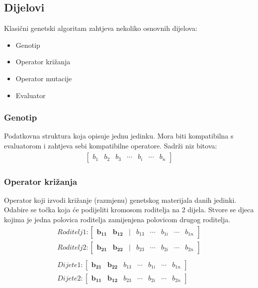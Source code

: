 \documentclass[times, utf8, zavrsni]{fer}
\begin{document}
\subsection{Dijelovi}
Klasični genetski algoritam zahtjeva nekoliko osnovnih dijelova:
\begin{itemize}
\item Genotip 
\item Operator križanja 
\item Operator mutacije
\item Evaluator 
\end{itemize}

\subsubsection{Genotip}
Podatkovna struktura koja opisuje jednu jedinku. Mora biti kompatibilna s evaluatorom i zahtjeva sebi kompatibilne operatore. Sadrži niz bitova:
\begin{align*}
\begin{bmatrix}
b_1 & b_2 & b_3 & \cdots & b_i & \cdots & b_n
\end{bmatrix}
\end{align*}
\subsubsection{Operator križanja}
Operator koji izvodi križanje (razmjenu) genetskog materijala danih jedinki. Odabire se točka koja će podijeliti kromosom roditelja na 2 dijela. Stvore se djeca kojima je jedna polovica roditelja zamijenjena polovicom drugog roditelja.
\begin{align*}
Roditelj 1:
\begin{bmatrix}
\mathbf{b_{11}} & \mathbf{b_{12}} & | & b_{13} & \cdots & b_{1i} & \cdots & b_{1n}
\end{bmatrix} \\
Roditelj 2:
\begin{bmatrix}
\mathbf{b_{21}} & \mathbf{b_{22}} & | & b_{23} & \cdots & b_{2i} & \cdots & b_{2n}
\end{bmatrix} \\\\
Dijete 1:
\begin{bmatrix}
\mathbf{b_{21}} & \mathbf{b_{22}} & b_{13} & \cdots & b_{1i} & \cdots & b_{1n}
\end{bmatrix} \\
Dijete 2:
\begin{bmatrix}
\mathbf{b_{11}} & \mathbf{b_{12}} & b_{23} & \cdots & b_{2i} & \cdots & b_{2n}
\end{bmatrix}
\end{align*}
\end{document}
